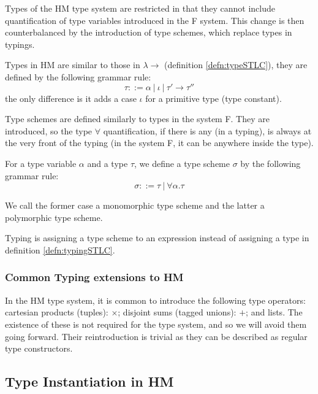 Types of the HM type system are restricted in that they cannot include quantification of type variables introduced in the F system. This change is then counterbalanced by the introduction of type schemes, which replace types in typings.

\begin{defn}[Type in HM]
    \label{defn:typeHM}
    Types in HM are similar to those in $\lambda\rightarrow$ (definition \ref{defn:typeSTLC}), they are defined by the following grammar rule:
    $$\tau ::= \alpha\ |\ \iota\ |\ \tau' \rightarrow \tau''$$
    the only difference is it adds a case $\iota$ for a primitive type (type constant).
\end{defn}

\begin{defn}
    \label{defn:schemeHM}
    Type schemes are defined similarly to types in the system F. They are introduced, so the type $\forall$ quantification, if there is any (in a typing), is always at the very front of the typing (in the system F, it can be anywhere inside the type).

    For a type variable $\alpha$ and a type $\tau$, we define a type scheme $\sigma$ by the following grammar rule:
    $$\sigma ::= \tau\ |\ \forall \alpha . \tau$$

    We call the former case a monomorphic type scheme and the latter a polymorphic type scheme.
\end{defn}

\begin{defn}[Typing in HM]
    Typing is assigning a type scheme to an expression instead of assigning a type in definition \ref{defn:typingSTLC}.
\end{defn}

\subsubsection{Common Typing extensions to HM}
\label{sssec:typingExt}

In the HM type system, it is common to introduce the following type operators: cartesian products (tuples): $\times$; disjoint sums (tagged unions): $+$; and lists. The existence of these is not required for the type system, and so we will avoid them going forward. Their reintroduction is trivial as they can be described as regular type constructors.

\subsection{Type Instantiation in HM}

